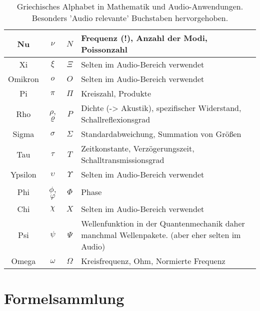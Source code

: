 \begin{table}[H]
\begin{tabular}{|c|c|c|p{7cm}|}
        \hline
        \rowcolor{tableHighligh}
        Nu      & $\nu$    & $N$ & Frequenz (!), Anzahl der Modi, Poissonzahl \\
        \hline
        Xi      & $\xi$    & $\Xi$ & Selten im Audio-Bereich verwendet \\
        \hline
        Omikron & $o$      & $O$ & Selten im Audio-Bereich verwendet \\
        \hline
        \rowcolor{tableHighligh}
        Pi      & $\pi$    & $\Pi$ & Kreiszahl, Produkte \\
        \hline
        \rowcolor{tableHighligh}
        Rho     & $\rho$, $\varrho$   & $P$ & Dichte (-> Akustik), spezifischer Widerstand,  Schallreflexionsgrad \\
        \hline
        \rowcolor{tableHighligh}
        Sigma   & $\sigma$ & $\Sigma$ & Standardabweichung, Summation von Größen \\
        \hline
        \rowcolor{tableHighligh}
        Tau     & $\tau$   & $T$ & Zeitkonstante, Verzögerungszeit, Schalltransmissionsgrad \\
        \hline
        Ypsilon & $\upsilon$ & $\Upsilon$ & Selten im Audio-Bereich verwendet \\
        \hline
        \rowcolor{tableHighligh}
        Phi     & $\phi$, $\varphi$   & $\Phi$ & Phase \\
        \hline
        Chi     & $\chi$   & $X$ & Selten im Audio-Bereich verwendet \\
        \hline
        Psi     & $\psi$   & $\Psi$ & Wellenfunktion in der Quantenmechanik daher manchmal Wellenpakete. (aber eher selten im Audio) \\
        \hline
        \rowcolor{tableHighligh}
        Omega   & $\omega$ & $\Omega$ & Kreisfrequenz, Ohm, Normierte Frequenz \\
        \hline
    \end{tabular}
    \caption{Griechisches Alphabet in Mathematik und Audio-Anwendungen. Besonders 'Audio relevante' Buchstaben hervorgehoben.}
\end{table}


\section*{Formelsammlung}



